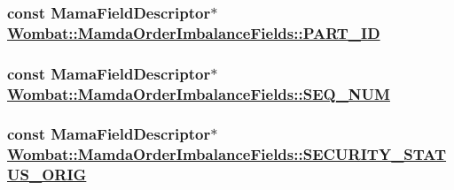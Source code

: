 \hypertarget{classWombat_1_1MamdaOrderImbalanceFields_8cb9096c581c0c13566e3f7107d565c2}{
\subsubsection[PART\_\-ID]{\setlength{\rightskip}{0pt plus 5cm}const Mama\-Field\-Descriptor$\ast$ \hyperlink{classWombat_1_1MamdaOrderImbalanceFields_8cb9096c581c0c13566e3f7107d565c2}{Wombat::Mamda\-Order\-Imbalance\-Fields::PART\_\-ID}}}
\label{classWombat_1_1MamdaOrderImbalanceFields_8cb9096c581c0c13566e3f7107d565c2}


\hypertarget{classWombat_1_1MamdaOrderImbalanceFields_28f51cfaed23b3d2083f5c306f68d88e}{
\subsubsection[SEQ\_\-NUM]{\setlength{\rightskip}{0pt plus 5cm}const Mama\-Field\-Descriptor$\ast$ \hyperlink{classWombat_1_1MamdaOrderImbalanceFields_28f51cfaed23b3d2083f5c306f68d88e}{Wombat::Mamda\-Order\-Imbalance\-Fields::SEQ\_\-NUM}}}
\label{classWombat_1_1MamdaOrderImbalanceFields_28f51cfaed23b3d2083f5c306f68d88e}


\hypertarget{classWombat_1_1MamdaOrderImbalanceFields_1ada5738f73c0759c3bb4c78fb715dea}{
\subsubsection[SECURITY\_\-STATUS\_\-ORIG]{\setlength{\rightskip}{0pt plus 5cm}const Mama\-Field\-Descriptor$\ast$ \hyperlink{classWombat_1_1MamdaOrderImbalanceFields_1ada5738f73c0759c3bb4c78fb715dea}{Wombat::Mamda\-Order\-Imbalance\-Fields::SECURITY\_\-STATUS\_\-ORIG}}}
\label{classWombat_1_1MamdaOrderImbalanceFields_1ada5738f73c0759c3bb4c78fb715dea}


